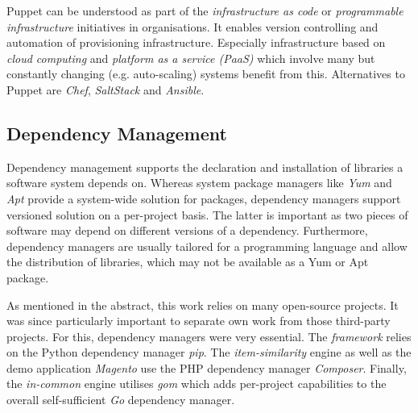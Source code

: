 Puppet can be understood as part of the \emph{infrastructure as code} or \emph{programmable infrastructure} initiatives in organisations. It enables version controlling and automation of provisioning infrastructure. Especially infrastructure based on \emph{cloud computing} and \emph{platform as a service (PaaS)} which involve many but constantly changing (e.g. auto-scaling) systems benefit from this. Alternatives to Puppet are \emph{Chef}, \emph{SaltStack} and \emph{Ansible}.

\subsection{Dependency Management}

Dependency management supports the declaration and installation of libraries a software system depends on. Whereas system package managers like \emph{Yum} and \emph{Apt} provide a system-wide solution for packages, dependency managers support versioned solution on a per-project basis. The latter is important as two pieces of software may depend on different versions of a dependency. Furthermore, dependency managers are usually tailored for a programming language and allow the distribution of libraries, which may not be available as a Yum or Apt package.

As mentioned in the abstract, this work relies on many open-source projects. It was since particularly important to separate own work from those third-party projects. For this, dependency managers were very essential. The \emph{framework} relies on the Python dependency manager \emph{pip}. The \emph{item-similarity} engine as well as the demo application \emph{Magento} use the PHP dependency manager \emph{Composer}. Finally, the \emph{in-common} engine utilises \emph{gom} which adds per-project capabilities to the overall self-sufficient \emph{Go} dependency manager.